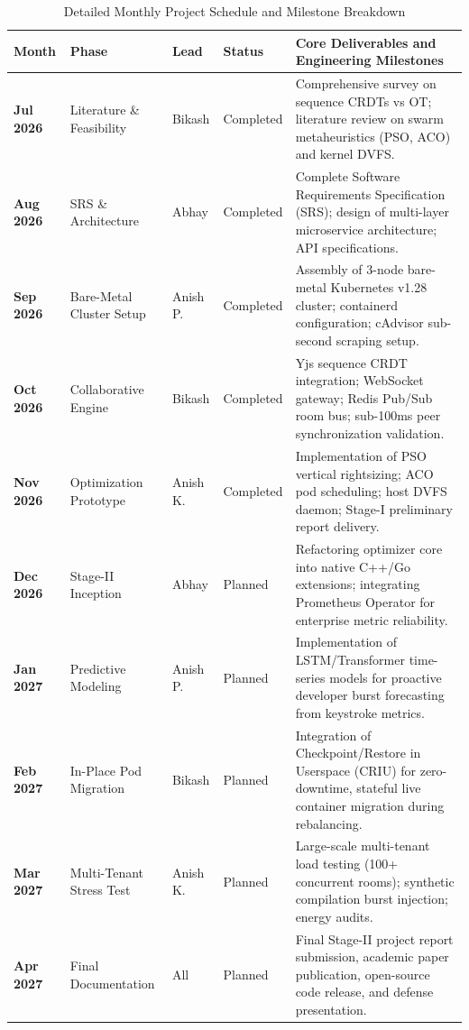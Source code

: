\documentclass[12pt,a4paper]{report}
\begin{document}
\begin{table}[htbp]
\centering
\scriptsize
\caption{Detailed Monthly Project Schedule and Milestone Breakdown}
\label{tab:detailed_schedule}
\begin{tabularx}{\linewidth}{@{}llllX@{}}
\toprule
\textbf{Month} & \textbf{Phase} & \textbf{Lead} & \textbf{Status} & \textbf{Core Deliverables and Engineering Milestones} \\ \midrule
\textbf{Jul 2026} & Literature \& Feasibility & Bikash & Completed & Comprehensive survey on sequence CRDTs vs OT; literature review on swarm metaheuristics (PSO, ACO) and kernel DVFS. \\
\textbf{Aug 2026} & SRS \& Architecture & Abhay & Completed & Complete Software Requirements Specification (SRS); design of multi-layer microservice architecture; API specifications. \\
\textbf{Sep 2026} & Bare-Metal Cluster Setup & Anish P. & Completed & Assembly of 3-node bare-metal Kubernetes v1.28 cluster; containerd configuration; cAdvisor sub-second scraping setup. \\
\textbf{Oct 2026} & Collaborative Engine & Bikash & Completed & Yjs sequence CRDT integration; WebSocket gateway; Redis Pub/Sub room bus; sub-100ms peer synchronization validation. \\
\textbf{Nov 2026} & Optimization Prototype & Anish K. & Completed & Implementation of PSO vertical rightsizing; ACO pod scheduling; host DVFS daemon; Stage-I preliminary report delivery. \\ \midrule
\textbf{Dec 2026} & Stage-II Inception & Abhay & Planned & Refactoring optimizer core into native C++/Go extensions; integrating Prometheus Operator for enterprise metric reliability. \\
\textbf{Jan 2027} & Predictive Modeling & Anish P. & Planned & Implementation of LSTM/Transformer time-series models for proactive developer burst forecasting from keystroke metrics. \\
\textbf{Feb 2027} & In-Place Pod Migration & Bikash & Planned & Integration of Checkpoint/Restore in Userspace (CRIU) for zero-downtime, stateful live container migration during rebalancing. \\
\textbf{Mar 2027} & Multi-Tenant Stress Test & Anish K. & Planned & Large-scale multi-tenant load testing (100+ concurrent rooms); synthetic compilation burst injection; energy audits. \\
\textbf{Apr 2027} & Final Documentation & All & Planned & Final Stage-II project report submission, academic paper publication, open-source code release, and defense presentation. \\ \bottomrule
\end{tabularx}
\end{table}
\end{document}
